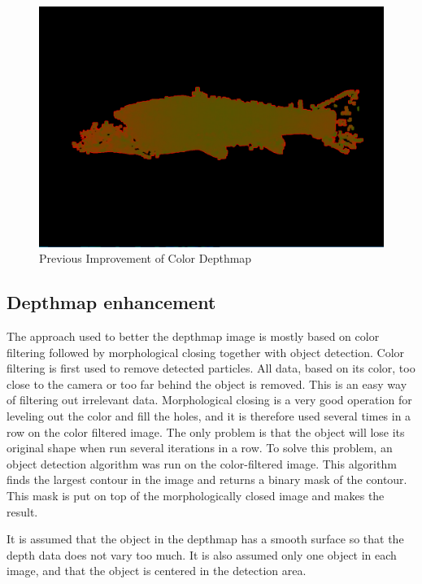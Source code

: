 \begin{figure}[H]
    \centering
    \includegraphics[width=.9\linewidth]{images/implementation/sealab_fish1}
    \caption{Previous Improvement of Color Depthmap}
    \label{fig:sealab_implementation}
\end{figure}




\subsection{Depthmap enhancement} \label{section:depthmap}

The approach used to better the depthmap image is mostly based on color filtering followed by morphological closing together with object detection. 
Color filtering is first used to remove detected particles. All data, based on its color, too close to the camera or too far behind the object is removed. This is an easy way of filtering out irrelevant data. Morphological closing is a very good operation for leveling out the color and fill the holes, and it is therefore used several times in a row on the color filtered image. The only problem is that the object will lose its original shape when run several iterations in a row. To solve this problem, an object detection algorithm was run on the color-filtered image. This algorithm finds the largest contour in the image and returns a binary mask of the contour. This mask is put on top of the morphologically closed image and makes the result.

It is assumed that the object in the depthmap has a smooth surface so that the depth data does not vary too much. It is also assumed only one object in each image, and that the object is centered in the detection area.

